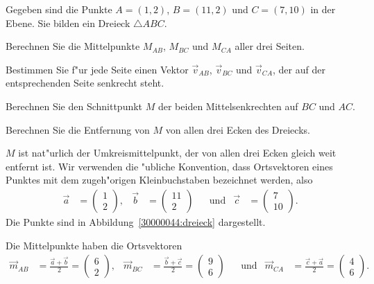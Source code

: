 Gegeben sind die Punkte $A=(1,2)$, $B=(11,2)$ und $C=(7,10)$
in der Ebene.
Sie bilden ein Dreieck $\triangle ABC$.
\begin{teilaufgaben}
\item Berechnen Sie die Mittelpunkte $M_{AB}$, $M_{BC}$ und $M_{CA}$ aller drei
Seiten.
\item Bestimmen Sie f"ur jede Seite einen Vektor $\vec{v}_{AB}$, $\vec{v}_{BC}$
und $\vec{v}_{CA}$, der auf der entsprechenden Seite senkrecht steht.
\item Berechnen Sie den Schnittpunkt $M$ der beiden Mittelsenkrechten auf
$BC$ und $AC$.
\item Berechnen Sie die Entfernung von $M$ von allen drei Ecken des Dreiecks.
\end{teilaufgaben}

\begin{loesung}
$M$ ist nat"urlich der Umkreismittelpunkt, der von allen drei Ecken gleich
weit entfernt ist.
Wir verwenden die "ubliche Konvention, dass Ortsvektoren eines Punktes
mit dem zugeh"origen Kleinbuchstaben bezeichnet werden, also
\[
\begin{aligned}
\vec{a}&=\begin{pmatrix} 1\\ 2\end{pmatrix},&
\vec{b}&=\begin{pmatrix}11\\ 2\end{pmatrix}&
&\text{und}&
\vec{c}&=\begin{pmatrix} 7\\10\end{pmatrix}.
\end{aligned}
\]
Die Punkte sind in Abbildung~\ref{30000044:dreieck} dargestellt.
\begin{teilaufgaben}
\item Die Mittelpunkte haben die Ortsvektoren
\[
\begin{aligned}
\vec{m}_{AB}&=\frac{\vec{a}+\vec{b}}2=\begin{pmatrix}6\\2\end{pmatrix},
&
\vec{m}_{BC}&=\frac{\vec{b}+\vec{c}}2=\begin{pmatrix}9\\6\end{pmatrix}
&
&\text{und}&
\vec{m}_{CA}&=\frac{\vec{c}+\vec{a}}2=\begin{pmatrix}4\\6\end{pmatrix}.

\end{aligned}\]
\end{teilaufgaben}
\end{loesung}
